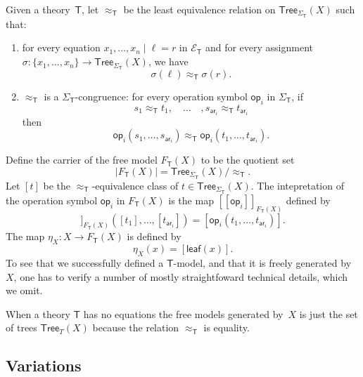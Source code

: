\documentclass{amsart}
\newcommand{\theory}[1]{\mathsf{#1}} %
\newcommand{\signature}[1]{\Sigma_{\theory{#1}}} %
\newcommand{\equations}[1]{\mathcal{E}_{\theory{#1}}} %
\newcommand{\Free}[2]{F_{\theory{#1}}(#2)} %
\newcommand{\set}[1]{\{#1\}} %
\newcommand{\Tree}[2]{\mathsf{Tree}_{#1}(#2)} %
\newcommand{\leaf}[1]{\mathsf{leaf}(#1)} %
\newcommand{\op}[1]{\mathsf{op}_{#1}} %
\newcommand{\arity}[1]{\mathsf{ar}_{#1}} %
\newcommand{\sem}[1]{[\![#1]\!]} %
\begin{document}
Given a theory~$\theory{T}$, let $\approx_\theory{T}$ be the least equivalence relation on
$\Tree{\signature{T}}{X}$ such that:
%
\begin{enumerate}
\item for every equation $x_1, \ldots, x_n \mid \ell = r$ in $\equations{T}$ and for every
  assignment $\sigma : \set{x_1, \ldots, x_n} \to \Tree{\signature{T}}{X}$, we have
  \begin{equation*}
    \sigma(\ell) \approx_{\theory{T}} \sigma(r).
  \end{equation*}
\item $\approx_{\theory{T}}$ is a $\signature{T}$-congruence: for every operation symbol
  $\op{i}$ in $\signature{T}$, if
  \begin{equation*}
    s_1 \approx_{\theory{T}} t_1,
    \quad \ldots \quad,
    s_{\arity{i}} \approx_{\theory{T}} t_{\arity{i}}
  \end{equation*}
  then
  \begin{equation*}
    \op{i}(s_1, \ldots, s_{\arity{i}}) \approx_{\theory{T}}
    \op{i}(t_1, \ldots, t_{\arity{i}}).
  \end{equation*}
\end{enumerate}
%
Define the carrier of the free model $\Free{T}{X}$ to be the quotient set
%
\begin{equation*}
  |\Free{T}{X}| = \Tree{\signature{T}}{X} / {\approx_{\theory{T}}}.
\end{equation*}
%
Let $[t]$ be the $\approx_{\theory{T}}$-equivalence class of
$t \in \Tree{\signature{T}}{X}$. The intepretation of the operation symbol $\op{i}$ in
  $\Free{T}{X}$ is the map $\sem{\op{i}}_{\Free{T}{X}}$ defined by
%
\begin{equation*}
  \sem{\op{i}}_{\Free{T}{X}}([t_1], \ldots, [t_{\arity{i}}]) =
  [\op{i}(t_1, \ldots, t_{\arity{i}})].
\end{equation*}
%
The map $\eta_X : X \to \Free{T}{X}$ is defined by
%
\begin{equation*}
  \eta_X(x) = [\leaf{x}].
\end{equation*}
%
To see that we successfully defined a $\theory{T}$-model, and that it is freely generated
by~$X$, one has to verify a number of mostly straightfoward technical details, which we
omit.

When a theory $\theory{T}$ has no equations the free models generated by~$X$ is just the
set of trees $\Tree{T}{X}$ because the relation $\approx_{\theory{T}}$ is equality.

\subsection{Variations}
\label{sec:variations}
\end{document}
